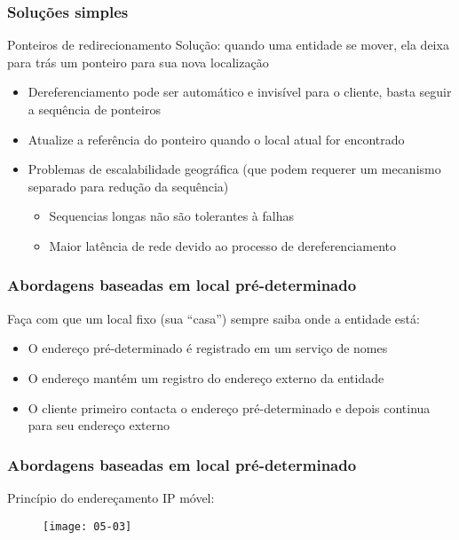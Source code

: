\documentclass[Ligatures=TeX,table,brazil,svgnames,usetotalslideindicator,compress,10pt]{beamer}
\begin{document}
\begin{frame}
  \frametitle{Soluções simples}

  \begin{block}{Ponteiros de redirecionamento}
    Solução: quando uma entidade se mover, ela deixa para trás um ponteiro para sua nova localização
    \begin{itemize}
    \item Dereferenciamento pode ser automático e invisível para o cliente, basta seguir a sequência de ponteiros
    \item Atualize a referência do ponteiro quando o local atual for encontrado
    \item Problemas de escalabilidade geográfica (que podem requerer um mecanismo separado para redução da sequência)
      \begin{itemize}
      \item Sequencias longas não são tolerantes à falhas
      \item Maior latência de rede devido ao processo de dereferenciamento
      \end{itemize}
    \end{itemize}
  \end{block}
\end{frame}

\begin{frame}
  \frametitle{Abordagens baseadas em local pré-determinado}
  Faça com que um local fixo (sua ``casa'') sempre saiba onde a entidade está:
  \begin{itemize}
  \item O endereço pré-determinado é registrado em um serviço de nomes
  \item O endereço mantém um registro do \alert{endereço externo} da entidade
  \item O cliente primeiro contacta o endereço pré-determinado e depois continua para seu endereço externo
  \end{itemize}
\end{frame}

\begin{frame}
  \frametitle{Abordagens baseadas em local pré-determinado}

  Princípio do endereçamento IP móvel:

  \begin{figure}
    \centering
  \texttt{[image: 05-03]}
  \end{figure}
\end{frame}
\end{document}
